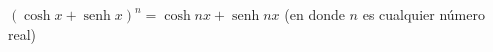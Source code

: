 \item $(\cosh x + \operatorname{senh} x)^n = \cosh nx + \operatorname{senh} nx$ (en donde $n$ es cualquier número real)
